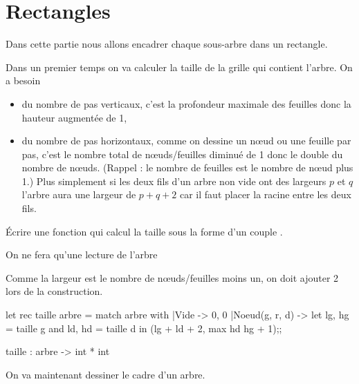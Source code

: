 \section{Rectangles}
Dans cette partie nous allons encadrer chaque sous-arbre dans un rectangle.

Dans un premier temps on va calculer la taille de la grille qui contient l'arbre. On a besoin
\begin{itemize}
  \item du nombre de pas verticaux, c'est la profondeur maximale des feuilles donc la hauteur augmentée de 1,
  \item du nombre de pas horizontaux, comme on dessine un nœud ou une feuille par pas, c'est le nombre total de nœuds/feuilles diminué de 1 donc le double du nombre de nœuds. (Rappel : le nombre de feuilles est le nombre de nœud plus 1.) Plus simplement si les deux fils d'un arbre non vide ont des largeurs $p$ et $q$ l'arbre aura une largeur de $p + q + 2$ car il faut placer la racine entre les deux fils.
\end{itemize}
\begin{question}{}{}
Écrire une fonction qui calcul la taille sous la forme d'un couple .

On ne fera qu'une lecture de l'arbre

\reponse

Comme la largeur est le nombre de nœuds/feuilles moins un, on doit ajouter 2 lors de la construction.
\begin{ocaml}
let rec taille arbre =
  match arbre with
  |Vide -> 0, 0
  |Noeud(g, r, d) -> let lg, hg = taille g 
                     and ld, hd = taille d in
                     (lg + ld + 2, max hd hg + 1);;
\end{ocaml}
\end{question}
\begin{ocaml}
taille : arbre -> int * int
\end{ocaml}
On va maintenant dessiner le cadre d'un arbre.

